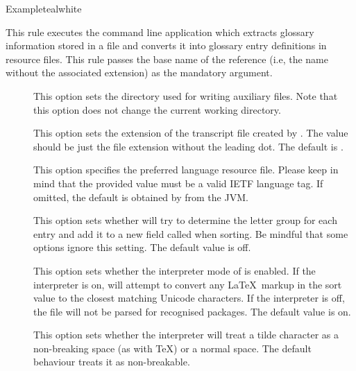 \begin{description}
\begin{codebox}{Example}{teal}{\icnote}{white}
\end{codebox}

\item[\rulebox{bib2gls}]
This rule executes the  command line application which extracts glossary information stored in a  file and converts it into glossary entry definitions in resource files. This rule passes the base name of the  reference (i.e, the name without the associated extension) as the mandatory argument.

\begin{description}
\item[] This option sets the directory used for writing auxiliary files. Note that this option does not change the current working directory.

\item[] This option sets the extension of the transcript file created by . The value should be just the file extension without the leading dot. The default is .

\item[] This option specifies the preferred language resource file. Please keep in mind that the provided value must be a valid IETF language tag. If omitted, the default is obtained by  from the JVM.

\item[] This option sets whether  will try to determine the letter group for each entry and add it to a new field called  when sorting. Be mindful that some  options ignore this setting. The default value is off.

\item[] This option sets whether the interpreter mode of  is enabled. If the interpreter is on,  will attempt to convert any \LaTeX\ markup in the sort value to the closest matching Unicode characters. If the interpreter is off, the  file will not be parsed for recognised packages. The default value is on.

\item[] This option sets whether the interpreter will treat a tilde character as a non-breaking space (as with \TeX) or a normal space. The default behaviour treats it as non-breakable.


\end{description}
\end{description}
